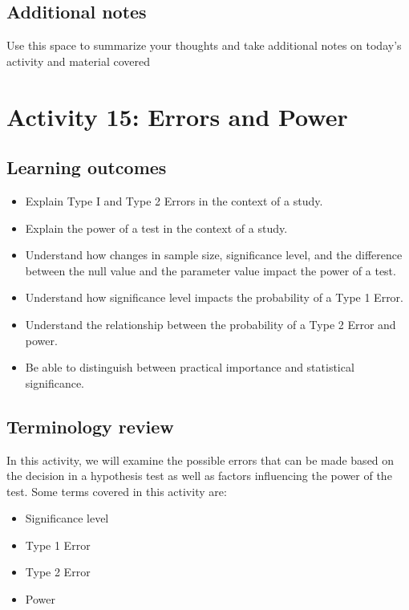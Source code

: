 \documentclass[
]{report}
\begin{document}
\subsection{Additional notes}\label{additional-notes-3}

Use this space to summarize your thoughts and take additional notes on today's activity and material covered

\newpage

\section{Activity 15: Errors and Power}\label{activity-15-errors-and-power}


\subsection{Learning outcomes}\label{learning-outcomes-4}

\begin{itemize}
\item
  Explain Type I and Type 2 Errors in the context of a study.
\item
  Explain the power of a test in the context of a study.
\item
  Understand how changes in sample size, significance level, and the difference between the null value and the parameter value impact the power of a test.
\item
  Understand how significance level impacts the probability of a Type 1 Error.
\item
  Understand the relationship between the probability of a Type 2 Error and power.
\item
  Be able to distinguish between practical importance and statistical significance.
\end{itemize}

\subsection{Terminology review}\label{terminology-review-4}

In this activity, we will examine the possible errors that can be made based on the decision in a hypothesis test as well as factors influencing the power of the test. Some terms covered in this activity are:

\begin{itemize}
\item
  Significance level
\item
  Type 1 Error
\item
  Type 2 Error
\item
  Power
\end{itemize}
\end{document}
